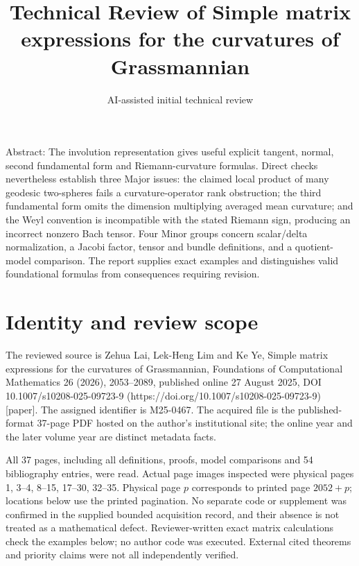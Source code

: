 \documentclass[10pt]{article}
\title{Technical Review of
Simple matrix expressions for the curvatures of Grassmannian}
\author{AI-assisted initial technical review}
\date{}
\begin{document}
\maketitle
Abstract: The involution representation gives useful explicit tangent, normal, second fundamental form and Riemann-curvature formulas. Direct checks nevertheless establish three Major issues: the claimed local product of many geodesic two-spheres fails a curvature-operator rank obstruction; the third fundamental form omits the dimension multiplying averaged mean curvature; and the Weyl convention is incompatible with the stated Riemann sign, producing an incorrect nonzero Bach tensor. Four Minor groups concern scalar/delta normalization, a Jacobi factor, tensor and bundle definitions, and a quotient-model comparison. The report supplies exact examples and distinguishes valid foundational formulas from consequences requiring revision.\par
\section*{Identity and review scope}
The reviewed source is Zehua Lai, Lek-Heng Lim and Ke Ye, Simple matrix expressions for the curvatures of Grassmannian, Foundations of Computational Mathematics 26 (2026), 2053–2089, published online 27 August 2025, DOI 10.1007/s10208-025-09723-9 (https://doi.org/10.1007/s10208-025-09723-9) [paper]. The assigned identifier is M25-0467. The acquired file is the published-format 37-page PDF hosted on the author’s institutional site; the online year and the later volume year are distinct metadata facts.\par
All 37 pages, including all definitions, proofs, model comparisons and 54 bibliography entries, were read. Actual page images inspected were physical pages 1, 3–4, 8–15, 17–30, 32–35. Physical page \(p\) corresponds to printed page \(2052+p\); locations below use the printed pagination. No separate code or supplement was confirmed in the supplied bounded acquisition record, and their absence is not treated as a mathematical defect. Reviewer-written exact matrix calculations check the examples below; no author code was executed. External cited theorems and priority claims were not all independently verified.\par
\end{document}
